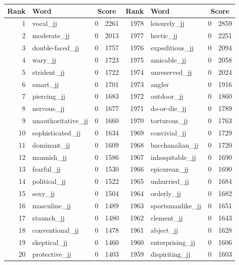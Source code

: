\begin{table}[tbp]
    \begin{tabular}{| rlr@{.}l | rlr@{.}l |}
    \hline
    \textbf{Rank} & \textbf{Word} & \multicolumn{2}{c|}{\textbf{Score}} & \textbf{Rank} & \textbf{Word} & \multicolumn{2}{c|}{\textbf{Score}} \\
    \hline
    1 & vocal\_jj & 0 & 2261    &    1978 & leisurely\_jj & 0 & 2859 \\
    2 & moderate\_jj & 0 & 2013    &    1977 & hectic\_jj & 0 & 2251 \\
    3 & double-faced\_jj & 0 & 1757    &    1976 & expeditious\_jj & 0 & 2094 \\
    4 & wary\_jj & 0 & 1723    &    1975 & amicable\_jj & 0 & 2058 \\
    5 & strident\_jj & 0 & 1722    &    1974 & unreserved\_jj & 0 & 2024 \\
    6 & smart\_jj & 0 & 1701    &    1973 & angler & 0 & 1916 \\
    7 & piercing\_jj & 0 & 1683    &    1972 & outdoor\_jj & 0 & 1860 \\
    8 & nervous\_jj & 0 & 1677    &    1971 & do-or-die\_jj & 0 & 1789 \\
    9 & unauthoritative\_jj & 0 & 1660    &    1970 & torturous\_jj & 0 & 1763 \\
    10 & sophisticated\_jj & 0 & 1634    &    1969 & convivial\_jj & 0 & 1729 \\
    11 & dominant\_jj & 0 & 1609    &    1968 & bacchanalian\_jj & 0 & 1720 \\
    12 & mannish\_jj & 0 & 1586    &    1967 & inhospitable\_jj & 0 & 1690 \\
    13 & fearful\_jj & 0 & 1530    &    1966 & epicurean\_jj & 0 & 1690 \\
    14 & political\_jj & 0 & 1522    &    1965 & unhurried\_jj & 0 & 1684 \\
    15 & sexy\_jj & 0 & 1504    &    1964 & orderly\_jj & 0 & 1682 \\
    16 & masculine\_jj & 0 & 1489    &    1963 & sportsmanlike\_jj & 0 & 1651 \\
    17 & staunch\_jj & 0 & 1480    &    1962 & clement\_jj & 0 & 1643 \\
    18 & conventional\_jj & 0 & 1478    &    1961 & abject\_jj & 0 & 1628 \\
    19 & skeptical\_jj & 0 & 1460    &    1960 & enterprising\_jj & 0 & 1606 \\
    20 & protective\_jj & 0 & 1403    &    1959 & dispiriting\_jj & 0 & 1603 \\

\end{tabular}
\end{table}
